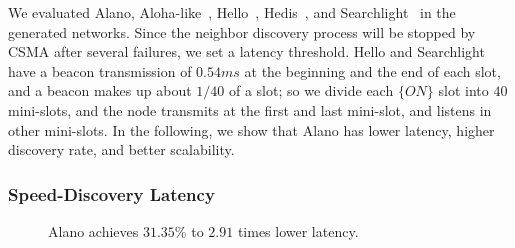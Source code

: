 We evaluated Alano, Aloha-like~\cite{you2011aloha}, Hello~\cite{sun2014hello}, Hedis~\cite{chen2015heterogeneous}, and Searchlight~\cite{bakht2012searchlight} in the generated networks.
Since the neighbor discovery process will be stopped by CSMA after several failures, we set a latency threshold.
Hello and Searchlight have a beacon transmission of $0.54ms$ at the
beginning and the end of each slot, and a beacon makes up about $1/40$ of a
slot; so we divide each $\{ON\}$ slot into $40$ mini-slots, and the node
transmits at the first and last mini-slot, and listens in other
mini-slots.
In the following, we show that Alano has lower latency, higher discovery
rate, and better scalability. %




\subsubsection{Speed-Discovery Latency}

\begin{figure}[!h]
\centering
{}
\hspace{0.01in}
\caption{Alano achieves $31.35\%$ to $2.91$ times lower latency.}
\label{fig_latency}
\end{figure}


